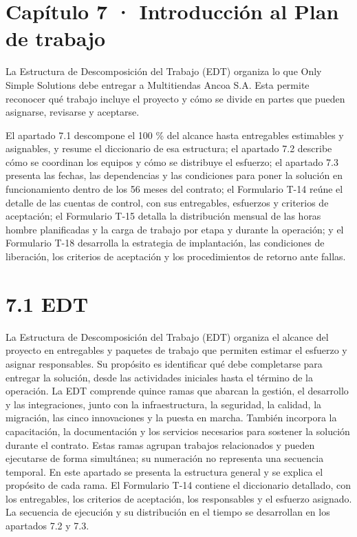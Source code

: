 \documentclass[11pt]{article}
\begin{document}
\makeatletter
\newcommand{\ossFigCaption}[1]{\def\@captype{figure}\caption{#1}}
\makeatother
\renewcommand{\tablename}{Tabla}
\renewcommand{\figurename}{Figura}
\renewcommand{\thefigure}{7.\arabic{figure}}
\renewcommand{\thetable}{7.\arabic{table}}

\tableofcontents
\clearpage

\section{Capítulo 7 · Introducción al Plan de trabajo}\label{capuxedtulo-7-introducciuxf3n-al-plan-de-trabajo}

La Estructura de Descomposición del Trabajo (EDT) organiza lo que Only Simple Solutions debe entregar a Multitiendas Ancoa S.A. Esta permite reconocer qué trabajo incluye el proyecto y cómo se divide en partes que pueden asignarse, revisarse y aceptarse.

El apartado 7.1 descompone el 100 \% del alcance hasta entregables estimables y asignables, y resume el diccionario de esa estructura; el apartado 7.2 describe cómo se coordinan los equipos y cómo  se distribuye el esfuerzo; el apartado 7.3 presenta las fechas, las dependencias y las condiciones para poner la solución en funcionamiento dentro de los 56 meses del contrato; el Formulario T-14 reúne el detalle de las cuentas de control, con sus entregables, esfuerzos y criterios de aceptación; el Formulario T-15 detalla la distribución mensual de las horas hombre planificadas y la carga de trabajo por etapa y durante la operación; y el Formulario T-18 desarrolla la estrategia de implantación, las condiciones de liberación, los criterios de aceptación y los procedimientos de retorno ante fallas.

\section{7.1 EDT}\label{edt}

La Estructura de Descomposición del Trabajo (EDT) organiza el alcance del proyecto en entregables y paquetes de trabajo que permiten estimar el esfuerzo y asignar responsables. Su propósito es identificar qué debe completarse para entregar la solución, desde las actividades iniciales hasta el término de la operación.
La EDT comprende quince ramas que abarcan la gestión, el desarrollo y las integraciones, junto con la infraestructura, la seguridad, la calidad, la migración, las cinco innovaciones y la puesta en marcha. También incorpora la capacitación, la documentación y los servicios necesarios para sostener la solución durante el contrato. Estas ramas agrupan trabajos relacionados y pueden ejecutarse de forma simultánea; su numeración no representa una secuencia temporal.
En este apartado se presenta la estructura general y se explica el propósito de cada rama. El Formulario T-14 contiene el diccionario detallado, con los entregables, los criterios de aceptación, los responsables y el esfuerzo asignado. La secuencia de ejecución y su distribución en el tiempo se desarrollan en los apartados 7.2 y 7.3.
\end{document}
